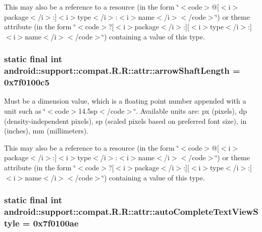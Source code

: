 This may also be a reference to a resource (in the form \char`\"{}$<$code$>$@\mbox{[}$<$i$>$package$<$/i$>$:\mbox{]}$<$i$>$type$<$/i$>$:$<$i$>$name$<$/i$>$$<$/code$>$\char`\"{}) or theme attribute (in the form \char`\"{}$<$code$>$?\mbox{[}$<$i$>$package$<$/i$>$:\mbox{]}\mbox{[}$<$i$>$type$<$/i$>$:\mbox{]}$<$i$>$name$<$/i$>$$<$/code$>$\char`\"{}) containing a value of this type. \hypertarget{classandroid_1_1support_1_1compat_1_1_r_1_1attr_c9d92383241ff7aa5f3fd35f822dc4f3}{
\subsubsection[{arrowShaftLength}]{\setlength{\rightskip}{0pt plus 5cm}static final int android::support::compat.R.R::attr::arrowShaftLength = 0x7f0100c5}}
\label{classandroid_1_1support_1_1compat_1_1_r_1_1attr_c9d92383241ff7aa5f3fd35f822dc4f3}


Must be a dimension value, which is a floating point number appended with a unit such as \char`\"{}$<$code$>$14.5sp$<$/code$>$\char`\"{}. Available units are: px (pixels), dp (density-independent pixels), sp (scaled pixels based on preferred font size), in (inches), mm (millimeters). 

This may also be a reference to a resource (in the form \char`\"{}$<$code$>$@\mbox{[}$<$i$>$package$<$/i$>$:\mbox{]}$<$i$>$type$<$/i$>$:$<$i$>$name$<$/i$>$$<$/code$>$\char`\"{}) or theme attribute (in the form \char`\"{}$<$code$>$?\mbox{[}$<$i$>$package$<$/i$>$:\mbox{]}\mbox{[}$<$i$>$type$<$/i$>$:\mbox{]}$<$i$>$name$<$/i$>$$<$/code$>$\char`\"{}) containing a value of this type. \hypertarget{classandroid_1_1support_1_1compat_1_1_r_1_1attr_454f21cac53bd7a448f9cd7d62a651ce}{
\subsubsection[{autoCompleteTextViewStyle}]{\setlength{\rightskip}{0pt plus 5cm}static final int android::support::compat.R.R::attr::autoCompleteTextViewStyle = 0x7f0100ae}}
\label{classandroid_1_1support_1_1compat_1_1_r_1_1attr_454f21cac53bd7a448f9cd7d62a651ce}


